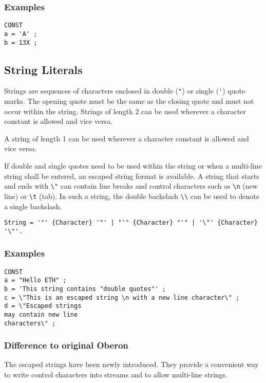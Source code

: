 \documentclass[a4wide,11pt]{article}
\begin{document}
\begin{annotation}
\subsubsection{Examples}
\begin{lstlisting}[style=example,caption= Examples of Character Literals in constant declarations]
CONST
a = 'A' ;
b = 13X ;
\end{lstlisting}
\end{annotation}

\subsection{String Literals}
Strings are sequences of characters enclosed in double (\verb~"~) or single (\verb~'~) quote marks.
The opening quote must be the same as the closing quote and must not occur within the string.
Strings of length 2 can be used wherever a character constant is allowed and vice versa.

A string of length 1 can be used wherever a character constant is allowed and vice versa.

If double and single quotes need to be used within the string or when a multi-line string shall be entered, an escaped string format is available.
A string that starts and ends with \verb~\"~ can contain line breaks and control characters such as \verb~\n~ (new line) or \verb~\t~ (tab).
In such a string, the double backslash \lstinline"\\" can be used to denote a single backslash.

\begin{lstlisting}[style=ebnf]
String = '"' {Character} '"' | "'" {Character} "'" | '\"' {Character} '\"'.
\end{lstlisting}

\begin{annotation}
\subsubsection{Examples}
\begin{lstlisting}[style=example, caption=Examples of string literals in constant declarations]
CONST
a = "Hello ETH" ;
b = 'This string contains "double quotes"' ;
c = \"This is an escaped string \n with a new line character\" ;
d = \"Escaped strings
may contain new line
characters\" ;
\end{lstlisting}

\subsubsection{Difference to original Oberon}
The escaped strings have been newly introduced.
They provide a convenient way to write control characters into streams and to allow multi-line strings.

\end{annotation}
\end{document}
